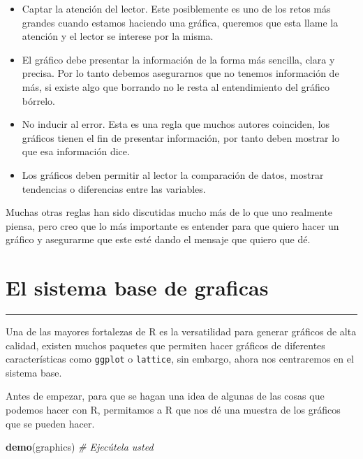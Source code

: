 \documentclass[]{article}
\newenvironment{Shaded}{\begin{snugshade}}{\end{snugshade}}
\newcommand{\KeywordTok}[1]{\textcolor[rgb]{0.13,0.29,0.53}{\textbf{{#1}}}}
\newcommand{\CommentTok}[1]{\textcolor[rgb]{0.56,0.35,0.01}{\textit{{#1}}}}
\newcommand{\NormalTok}[1]{{#1}}
\begin{document}
\begin{itemize}
\item
  Captar la atención del lector. Este posiblemente es uno de los retos
  más grandes cuando estamos haciendo una gráfica, queremos que esta
  llame la atención y el lector se interese por la misma.
\item
  El gráfico debe presentar la información de la forma más sencilla,
  clara y precisa. Por lo tanto debemos asegurarnos que no tenemos
  información de más, si existe algo que borrando no le resta al
  entendimiento del gráfico bórrelo.
\item
  No inducir al error. Esta es una regla que muchos autores coinciden,
  los gráficos tienen el fin de presentar información, por tanto deben
  mostrar lo que esa información dice.
\item
  Los gráficos deben permitir al lector la comparación de datos, mostrar
  tendencias o diferencias entre las variables.
\end{itemize}

Muchas otras reglas han sido discutidas mucho más de lo que uno
realmente piensa, pero creo que lo más importante es entender para que
quiero hacer un gráfico y asegurarme que este esté dando el mensaje que
quiero que dé.

\section{El sistema base de graficas}\label{el-sistema-base-de-graficas}

\begin{center}\rule{0.5\linewidth}{\linethickness}\end{center}

Una de las mayores fortalezas de R es la versatilidad para generar
gráficos de alta calidad, existen muchos paquetes que permiten hacer
gráficos de diferentes características como \texttt{ggplot} o
\texttt{lattice}, sin embargo, ahora nos centraremos en el sistema base.

Antes de empezar, para que se hagan una idea de algunas de las cosas que
podemos hacer con R, permitamos a R que nos dé una muestra de los
gráficos que se pueden hacer.

\begin{Shaded}
\begin{Highlighting}[]
\KeywordTok{demo}\NormalTok{(graphics) }\CommentTok{# Ejecútela usted}
\end{Highlighting}
\end{Shaded}
\end{document}
